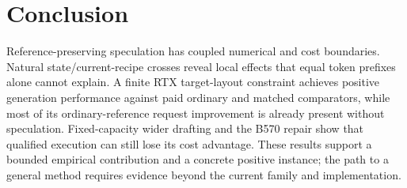 \documentclass{article}
\begin{document}
\section{Conclusion}
Reference-preserving speculation has coupled numerical and cost boundaries. Natural state/current-recipe crosses reveal local effects that equal token prefixes alone cannot explain. A finite RTX target-layout constraint achieves positive generation performance against paid ordinary and matched comparators, while most of its ordinary-reference request improvement is already present without speculation. Fixed-capacity wider drafting and the B570 repair show that qualified execution can still lose its cost advantage. These results support a bounded empirical contribution and a concrete positive instance; the path to a general method requires evidence beyond the current family and implementation.

\label{maintextend}
\clearpage

\end{document}
